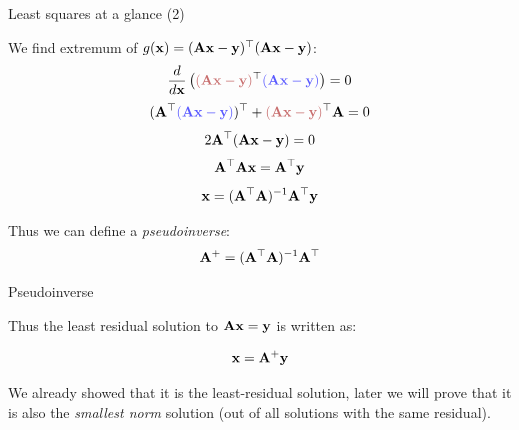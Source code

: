 \documentclass{beamer}
\begin{document}
\begin{frame}{Least squares at a glance (2)}
	\begin{flushleft}
		
		We find extremum of $g(\mathbf{x}) = (\mathbf{A}\mathbf{x} - \mathbf{y})^\top(\mathbf{A}\mathbf{x} - \mathbf{y})$:
		\begin{equation}
			\frac{d}{d \bo{x}} \left( 
			\textcolor{myred}{(\bo{A}\bo{x} - \bo{y})}^\top
			\textcolor{myblue}{(\bo{A}\bo{x} - \bo{y}) }
			\right) 
			= 0
		\end{equation}
		\begin{equation}
			(\bo{A}\T \textcolor{myblue}{(\bo{A}\bo{x} - \bo{y}) } )\T + 
			\textcolor{myred}{(\bo{A}\bo{x} - \bo{y})}^\top\bo{A}
			= 0
		\end{equation}
		\begin{equation}
			2\mathbf{A}^\top(\mathbf{A}\mathbf{x} - \mathbf{y}) = 0
		\end{equation}
		\begin{equation}
			\mathbf{A}^\top\mathbf{A}\mathbf{x} = \mathbf{A}^\top\mathbf{y}
		\end{equation}
		\begin{equation}
			\mathbf{x} = (\mathbf{A}^\top\mathbf{A})^{-1} \mathbf{A}^\top\mathbf{y}
		\end{equation}
		
		Thus we can define a \emph{pseudoinverse}:
		\begin{equation}
			\mathbf{A}^+ = (\mathbf{A}^\top\mathbf{A})^{-1} \mathbf{A}^\top
		\end{equation}
		
		
	\end{flushleft}
\end{frame}



\begin{frame}{Pseudoinverse}
	\begin{flushleft}
		
		Thus the least residual solution to $\mathbf{A}\mathbf{x} = \mathbf{y}$ is written as:
		
		\begin{equation}
			\mathbf{x} = \mathbf{A}^+\mathbf{y}
		\end{equation}
		
		We already showed that it is the least-residual solution, later we will prove that it is also the \emph{smallest norm} solution (out of all solutions with the same residual).
		
	\end{flushleft}
\end{frame}
\end{document}

